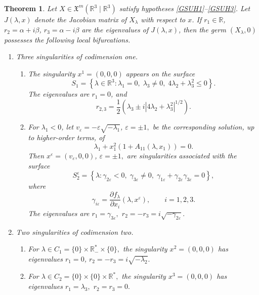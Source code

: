 \documentclass[12pt]{article}
\newtheorem{theorem}{Theorem}[section]
\newtheorem{remark definition}{Remark Definition}[section]
\begin{document}
\begin{theorem}
	Let $X\in \mathfrak{X}^{m}(\mathbb{R}^{3}\mid \mathbb{R}^{3})$
	satisfy hypotheses \eqref{GSUH1}--\eqref{GSUH3}. Let
	$J(\lambda,x)$ denote the Jacobian matrix of $X_\lambda$ with respect to
	$x$. If $r_1\in \mathbb{R}$, $r_2=\alpha+i\beta$, $r_3=\alpha-i\beta$
	are the eigenvalues of $J(\lambda,x)$, then the germ
	$(X_\lambda,0)$ possesses the following local bifurcations.
	
	\begin{enumerate}
		\item Three singularities of codimension one.
		
		\begin{enumerate}
			\item The singularity $	x^1=(0,0,0)$
			appears on the surface
			$$
			S_1=
			\left\{
			\lambda\in \mathbb{R}^3:
			\lambda_1=0,\;
			\lambda_3\neq 0,\;
			4\lambda_2+\lambda_3^2\leq 0
			\right\}.
			$$
			The eigenvalues are $r_1=0$,	and
			$$
			r_{2,3}
			=
			\frac{1}{2}
			\left(
			\lambda_3
			\pm
			i\left|4\lambda_2+\lambda_3^2\right|^{1/2}
			\right).
			$$
			
			\item For $\lambda_1<0$, let $v_\varepsilon	=-\varepsilon\sqrt{-\lambda_1}$, $\varepsilon=\pm 1,$
			be the corresponding solution, up to higher-order terms, of
			$$
			\lambda_1+x_1^2
			\left(
			1+A_{11}(\lambda,x_1)
			\right)=0.
			$$
			Then $x^\varepsilon=(v_\varepsilon,0,0)$, $\varepsilon=\pm 1,$
			are singularities associated with the surface
			$$
			S_2^\varepsilon
			=
			\left\{
			\lambda:
			\gamma_{2\varepsilon}<0,\;
			\gamma_{3\varepsilon}\neq 0,\;
			\gamma_{1\varepsilon}
			+
			\gamma_{2\varepsilon}\gamma_{3\varepsilon}=0
			\right\},
			$$
			where
			$$
			\gamma_{i\varepsilon}
			=
			\frac{\partial f_\lambda}{\partial x_i}
			(\lambda,x^\varepsilon),
			\qquad
			i=1,2,3.
			$$
			The eigenvalues are $r_1=\gamma_{3\varepsilon},$ $r_2=-r_3=i\sqrt{-\gamma_{2\varepsilon}}.$
		\end{enumerate}
		
		\item Two singularities of codimension two.
		
		\begin{enumerate}
			\item For $\lambda\in C_1=\{0\}\times \mathbb{R}_{-}^{\ast}\times \{0\},$
			the singularity $x^2=(0,0,0)$
			has eigenvalues $r_1=0$, $r_2=-r_3=i\sqrt{-\lambda_2}.$
			
			\item For $\lambda\in C_2=\{0\}\times \{0\}\times \mathbb{R}^{\ast},$
			the singularity $x^3=(0,0,0)$ has eigenvalues $r_1=\lambda_3,$ 
			$r_2=r_3=0.$
		\end{enumerate}
	\end{enumerate}
\end{theorem}
\end{document}

